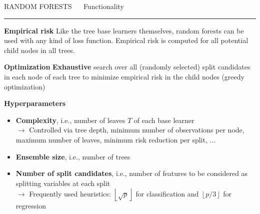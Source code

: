 \documentclass[11pt,compress,t,notes=noshow, xcolor=table]{beamer}
\begin{document}

\LARGE
\begin{frame}{\textcolor{gray!80}{RANDOM FORESTS} ~~ Functionality}
\normalsize
\vspace{-0.5cm}
\noindent \textcolor{gray!80}{\rule{\textwidth}{1pt}}

\footnotesize

\textbf{\textcolor{gray!80}{Empirical risk}} {}{}
Like the tree base learners themselves, random forests can be used with any
kind of loss function. Empirical risk is computed for all potential child nodes
in all trees.

\medskip

\textbf{\textcolor{gray!80}{Optimization}} {}{} \textbf{Exhaustive} search over
all (randomly selected) split candidates in each node of each tree to minimize
empirical risk in the child nodes (greedy optimization) \\

\medskip

\textbf{\textcolor{gray!80}{Hyperparameters}}

\begin{itemize}
  \item \textbf{Complexity}, i.e., number of leaves $T$ of each base learner \\
  $\rightarrow$ Controlled via tree depth, minimum number of observations per 
  node, maximum number of leaves, minimum risk reduction per split, ...
  \item \textbf{Ensemble size}, i.e., number of trees
  \item \textbf{Number of split candidates}, i.e., number of features to be
  considered as splitting variables at each split \\
  $\rightarrow$ Frequently used heuristics: 
  $\left \lfloor{\sqrt{p}}\right \rfloor$ for classification and
  $\left \lfloor{p/3}\right \rfloor$ for regression
  
\end{itemize}
  
\end{frame}


\end{document}
